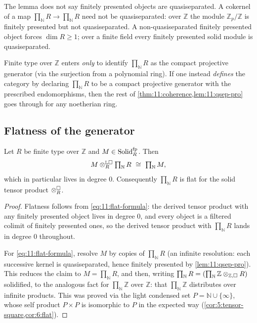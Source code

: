 \begin{remark}
\label{rmk:11:fp-not-qsep}
The lemma does not say finitely presented objects are quasiseparated. A
cokernel of a map $\prod_{\mathbb{N}}R\to\prod_{\mathbb{N}}R$ need not be
quasiseparated: over $\mathbb{Z}$ the module $\mathbb{Z}_{p}/\mathbb{Z}$ is
finitely presented but not quasiseparated. A non-quasiseparated finitely
presented object forces $\dim R\ge 1$; over a finite field every finitely
presented solid module is quasiseparated.
\end{remark}

\begin{remark}
\label{rmk:11:where-finite-type}
Finite type over $\mathbb{Z}$ enters \emph{only} to identify
$\prod_{\mathbb{N}}R$ as the compact projective generator (via the surjection
from a polynomial ring). If one instead \emph{defines} the category by
declaring $\prod_{\mathbb{N}}R$ to be a compact projective generator with the
prescribed endomorphisms, then the rest of \cref{thm:11:coherence,lem:11:qsep-pro} goes through for any noetherian ring.
\end{remark}

\subsection{Flatness of the generator}

\begin{proposition}
\label{prop:11:flat}
Let $R$ be finite type over $\mathbb{Z}$ and $M\in\mathrm{Solid}_{R}^{\mathrm{fp}}$.
Then
\begin{equation}
\label{eq:11:flat-formula}
M\otimes^{\mathbb{L}\square}_{R}\textstyle\prod_{\mathbb{N}}R\ \cong\
\textstyle\prod_{\mathbb{N}}M,
\end{equation}
which in particular lives in degree $0$. Consequently $\prod_{\mathbb{N}}R$ is
flat for the solid tensor product $\otimes^{\square}_{R}$.
\end{proposition}

\begin{proof}
Flatness follows from \eqref{eq:11:flat-formula}: the derived tensor product
with any finitely presented object lives in degree $0$, and every object is a
filtered colimit of finitely presented ones, so the derived tensor product
with $\prod_{\mathbb{N}}R$ lands in degree $0$ throughout.

For \eqref{eq:11:flat-formula}, resolve $M$ by copies of $\prod_{\mathbb{N}}R$
(an infinite resolution: each successive kernel is quasiseparated, hence
finitely presented by \cref{lem:11:qsep-pro}). This reduces the claim to
$M=\prod_{\mathbb{N}}R$, and then, writing $\prod_{\mathbb{N}}R=(\prod_{\mathbb
{N}}\mathbb{Z}\otimes_{\mathbb{Z},\square}R)$ solidified, to the analogous fact
for $\prod_{\mathbb{N}}\mathbb{Z}$ over $\mathbb{Z}$: that
$\prod_{\mathbb{N}}\mathbb{Z}$ distributes over infinite products. This was
proved via the light condensed set $P=\mathbb{N}\cup\{\infty\}$, whose self
product $P\times P$ is isomorphic to $P$ in the expected way
(\cref{cor:5:tensor-square,cor:6:flat}).
\end{proof}


